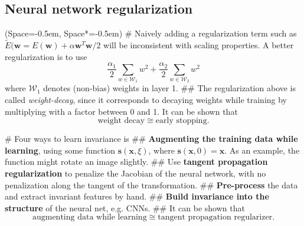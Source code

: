 \documentclass[12pt, a4paper]{article}
\newcommand{\listSpace}{-0.5em}%
\newcommand{\vect}[1]{\bm{#1}}
\begin{document}
\subsection*{Neural network regularization}
\begin{easylist}[itemize]
	\ListProperties(Space=\listSpace, Space*=\listSpace)
	# Naively adding a regularization term such as $\widetilde{E}(\vect{w} = E(\vect{w}) + \alpha \vect{w}^T \vect{w}/2$ will be inconsistent with scaling properties.
	A better regularization is to use
	\begin{equation*}
		\frac{\alpha_1}{2} \sum_{w \in \mathcal{W}_1} w^2
		+
		\frac{\alpha_2}{2} \sum_{w \in \mathcal{W}_2} w^2
	\end{equation*}
	where $\mathcal{W}_1$ denotes (non-bias) weights in layer 1.
	## The regularization above is called \emph{weight-decay}, since it corresponds to decaying weights while training by multiplying with a factor between 0 and 1. 
	It can be shown that
	\begin{equation*}
		\text{weight decay} \cong \text{early stopping}.
	\end{equation*}
	
	# Four ways to learn invariance is
	## \textbf{Augmenting the training data while learning}, using some function $\vect{s}(\vect{x}, \xi)$, where $\vect{s}(\vect{x}, 0) = \vect{x}$.
	As an example, the function might rotate an image slightly.
	## Use \textbf{tangent propagation regularization} to penalize the Jacobian of the neural network, with no penalization along the tangent of the transformation.
	## \textbf{Pre-process} the data and extract invariant features by hand.
	## \textbf{Build invariance into the structure} of the neural net, e.g. CNNs.
	## It can be shown that 
	\begin{equation*}
	\text{augmenting data while learning} \cong \text{tangent propagation regularizer}.
	\end{equation*}
\end{easylist}
\end{document}
